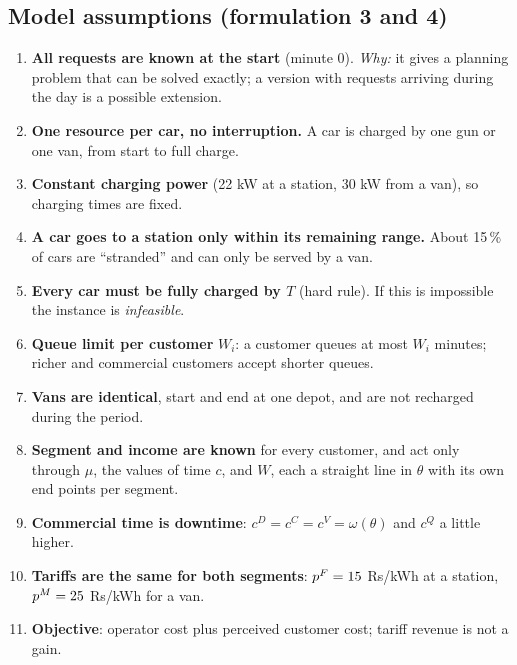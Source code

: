 \subsection{Model assumptions (formulation 3 and 4)}
\begin{enumerate}[leftmargin=*]
  \item \textbf{All requests are known at the start} (minute 0). \emph{Why:} it gives a planning problem that can be solved exactly; a version with requests arriving during the day is a possible extension.
  \item \textbf{One resource per car, no interruption.} A car is charged by one gun or one van, from start to full charge.
  \item \textbf{Constant charging power} (22 kW at a station, 30 kW from a van), so charging times are fixed.
  \item \textbf{A car goes to a station only within its remaining range.} About 15\,\% of cars are ``stranded'' and can only be served by a van.
  \item \textbf{Every car must be fully charged by $T$} (hard rule). If this is impossible the instance is \emph{infeasible}.
  \item \textbf{Queue limit per customer} $W_i$: a customer queues at most $W_i$ minutes; richer and commercial customers accept shorter queues.
  \item \textbf{Vans are identical}, start and end at one depot, and are not recharged during the period.
  \item \textbf{Segment and income are known} for every customer, and act only through $\mu$, the values of time $c$, and $W$, each a straight line in $\theta$ with its own end points per segment.
  \item \textbf{Commercial time is downtime}: $c^D=c^C=c^V=\omega(\theta)$ and $c^Q$ a little higher.
  \item \textbf{Tariffs are the same for both segments}: $p^F=15$ Rs/kWh at a station, $p^M=25$ Rs/kWh for a van.
  \item \textbf{Objective}: operator cost plus perceived customer cost; tariff revenue is not a gain.
\end{enumerate}

